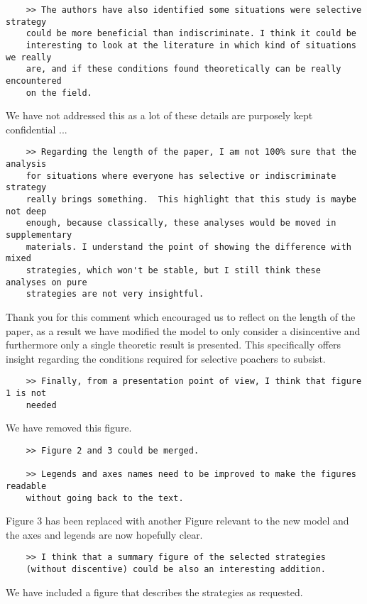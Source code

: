 \documentclass[10pt]{article}
\begin{document}
\begin{verbatim}
    >> The authors have also identified some situations were selective strategy
    could be more beneficial than indiscriminate. I think it could be
    interesting to look at the literature in which kind of situations we really
    are, and if these conditions found theoretically can be really encountered
    on the field.
\end{verbatim}

We have not addressed this as a lot of these details are purposely kept
confidential ... %


\begin{verbatim}
    >> Regarding the length of the paper, I am not 100% sure that the analysis
    for situations where everyone has selective or indiscriminate strategy
    really brings something.  This highlight that this study is maybe not deep
    enough, because classically, these analyses would be moved in supplementary
    materials. I understand the point of showing the difference with mixed
    strategies, which won't be stable, but I still think these analyses on pure
    strategies are not very insightful.
\end{verbatim}

Thank you for this comment which encouraged us to reflect on the length of the
paper, as a result we have modified the model to only consider a disincentive
and furthermore only a single theoretic result is presented. This specifically
offers insight regarding the conditions required for selective poachers to
subsist.

\begin{verbatim}
    >> Finally, from a presentation point of view, I think that figure 1 is not
    needed
\end{verbatim}

We have removed this figure.

\begin{verbatim}
    >> Figure 2 and 3 could be merged.

    >> Legends and axes names need to be improved to make the figures readable
    without going back to the text.
\end{verbatim}

Figure 3 has been replaced with another Figure relevant to the new model and the
axes and legends are now hopefully clear.

\begin{verbatim}
    >> I think that a summary figure of the selected strategies
    (without discentive) could be also an interesting addition.
\end{verbatim}

We have included a figure that describes the strategies as requested.
\end{document}
